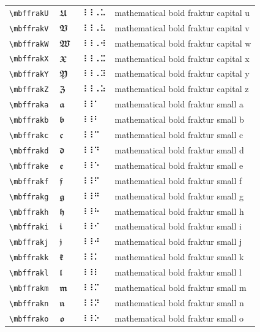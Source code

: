 \documentclass[oneside]{article}
\begin{document}
\begin{longtable}{llll}
\verb|\mbffrakU| & $\mbffrakU$ &  ⠸⠸⠠⠥  & {mathematical bold fraktur capital u} \\[2ex]
\verb|\mbffrakV| & $\mbffrakV$ &  ⠸⠸⠠⠧  & {mathematical bold fraktur capital v} \\[2ex]
\verb|\mbffrakW| & $\mbffrakW$ &  ⠸⠸⠠⠺  & {mathematical bold fraktur capital w} \\[2ex]
\verb|\mbffrakX| & $\mbffrakX$ &  ⠸⠸⠠⠭  & {mathematical bold fraktur capital x} \\[2ex]
\verb|\mbffrakY| & $\mbffrakY$ &  ⠸⠸⠠⠽  & {mathematical bold fraktur capital y} \\[2ex]
\verb|\mbffrakZ| & $\mbffrakZ$ &  ⠸⠸⠠⠵  & {mathematical bold fraktur capital z} \\[2ex]
\verb|\mbffraka| & $\mbffraka$ &  ⠸⠸⠁  & {mathematical bold fraktur small a} \\[2ex]
\verb|\mbffrakb| & $\mbffrakb$ &  ⠸⠸⠃  & {mathematical bold fraktur small b} \\[2ex]
\verb|\mbffrakc| & $\mbffrakc$ &  ⠸⠸⠉  & {mathematical bold fraktur small c} \\[2ex]
\verb|\mbffrakd| & $\mbffrakd$ &  ⠸⠸⠙  & {mathematical bold fraktur small d} \\[2ex]
\verb|\mbffrake| & $\mbffrake$ &  ⠸⠸⠑  & {mathematical bold fraktur small e} \\[2ex]
\verb|\mbffrakf| & $\mbffrakf$ &  ⠸⠸⠋  & {mathematical bold fraktur small f} \\[2ex]
\verb|\mbffrakg| & $\mbffrakg$ &  ⠸⠸⠛  & {mathematical bold fraktur small g} \\[2ex]
\verb|\mbffrakh| & $\mbffrakh$ &  ⠸⠸⠓  & {mathematical bold fraktur small h} \\[2ex]
\verb|\mbffraki| & $\mbffraki$ &  ⠸⠸⠊  & {mathematical bold fraktur small i} \\[2ex]
\verb|\mbffrakj| & $\mbffrakj$ &  ⠸⠸⠚  & {mathematical bold fraktur small j} \\[2ex]
\verb|\mbffrakk| & $\mbffrakk$ &  ⠸⠸⠅  & {mathematical bold fraktur small k} \\[2ex]
\verb|\mbffrakl| & $\mbffrakl$ &  ⠸⠸⠇  & {mathematical bold fraktur small l} \\[2ex]
\verb|\mbffrakm| & $\mbffrakm$ &  ⠸⠸⠍  & {mathematical bold fraktur small m} \\[2ex]
\verb|\mbffrakn| & $\mbffrakn$ &  ⠸⠸⠝  & {mathematical bold fraktur small n} \\[2ex]
\verb|\mbffrako| & $\mbffrako$ &  ⠸⠸⠕  & {mathematical bold fraktur small o} \\[2ex]

\end{longtable}
\end{document}
